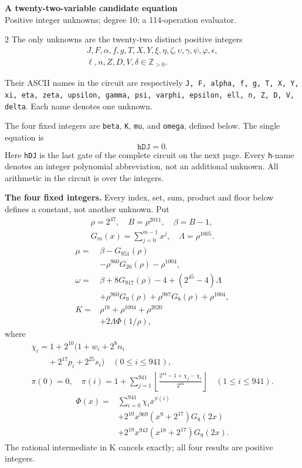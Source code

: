 \documentclass[10pt]{article}
\newcommand{\fl}[1]{\left\lfloor#1\right\rfloor}
\begin{document}
\begin{center}
{\large\bfseries A twenty-two-variable candidate equation}\\[-1pt]
{\small Positive integer unknowns; degree 10; a 114-operation evaluator.}
\end{center}\vspace{-8pt}
\begin{multicols}{2}
\fontsize{8.6}{9.1}\selectfont
The only unknowns are the twenty-two distinct positive integers
\[
\begin{gathered}J,F,\alpha,f,g,T,X,Y,\xi,\eta,\zeta,\upsilon,\gamma,\psi,\varphi,\epsilon,\\\ell,n,Z,D,V,\delta\in\mathbb Z_{>0}.\end{gathered}
\]
{\raggedright Their ASCII names in the circuit are respectively
\texttt{J, F, alpha, f, g, T, X, Y, xi, eta, zeta, upsilon, gamma, psi,
varphi, epsilon, ell, n, Z, D, V, delta}. Each name denotes one unknown.\par}
The four fixed integers are \texttt{beta}, \texttt{K}, \texttt{mu}, and
\texttt{omega}, defined below. The single equation is
\[
\boxed{\texttt{hDJ}=0.}
\]
Here \texttt{hDJ} is the last gate of the complete circuit on the next page.
Every \texttt{h}-name denotes an integer polynomial abbreviation, not an
additional unknown. All arithmetic in the circuit is over the integers.

\textbf{The four fixed integers.}
Every index, set, sum, product and floor below defines a constant, not
another unknown. Put
\[
\begin{gathered}
\rho=2^{47},\quad B=\rho^{2011},\quad\beta=B-1,\\
G_m(x)=\sum_{j=0}^{m-1}x^j,\quad
\Lambda=\rho^{1005}.
\end{gathered}
\]
\begin{align*}
\mu={}&\beta-G_{951}(\rho)\\
&-\rho^{960}G_{26}(\rho)-\rho^{1004},\\
\omega={}&\beta+8G_{917}(\rho)-4+(2^{45}-4)\Lambda\\
&+\rho^{960}G_9(\rho)+\rho^{987}G_8(\rho)
  +\rho^{1004},\\
K={}&\rho^{18}+\rho^{1004}+\rho^{2020}\\
&+2\Lambda\Phi(1/\rho),
\end{align*}
where
\[
\begin{gathered}
\chi_i=1+2^{10}(1+w_i+2^8n_i\\
\qquad+2^{17}p_i+2^{25}s_i)\quad(0\le i\le941),\\
\pi(0)=0,\quad\pi(i)=1+\sum_{j=1}^{941}
\fl{\frac{2^{44}-1+\chi_j-\chi_i}{2^{44}}}\quad(1\le i\le941).
\end{gathered}
\]
\[
\begin{split}
\Phi(x)={}&\sum_{i=0}^{941}\chi_i x^{\pi(i)}\\
&+2^{10}x^{969}(x^9+2^{17})G_8(2x)\\
&+2^{18}x^{942}(x^{18}+2^{17})G_9(2x).
\end{split}
\]
The rational intermediate in K cancels exactly; all four results are positive integers.


\end{multicols}
\end{document}

